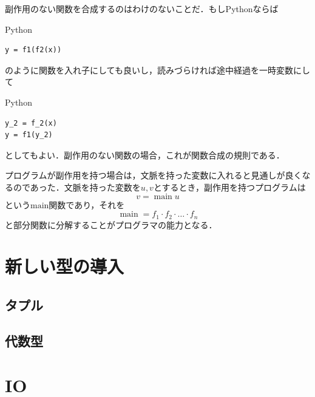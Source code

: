 \documentclass[a4paper]{jsbook}
\newcommand{\programminglanguage}[1]{\textsf{#1}}
\newcommand{\python}{\programminglanguage{Python}}
\newcommand{\code}[1]{\texttt{#1}}
\newenvironment{pythoncode}{\begin{itembox}[r]{\python}}{\end{itembox}}
\DeclareMathOperator{\mathMain}{main}
\newcommand{\mathGeneralMap}{\mathbin{\cdot}}
\begin{document}
副作用のない関数を合成するのはわけのないことだ．もし\python ならば
\begin{pythoncode}
\begin{verbatim}
y = f1(f2(x))
\end{verbatim}
\end{pythoncode}
のように関数を入れ子にしても良いし，読みづらければ途中経過を一時変数にして
\begin{pythoncode}
\begin{verbatim}
y_2 = f_2(x)
y = f1(y_2)
\end{verbatim}
\end{pythoncode}
としてもよい．副作用のない関数の場合，これが関数合成の規則である．

プログラムが副作用を持つ場合は，文脈を持った変数に入れると見通しが良くなるのであった．文脈を持った変数を$u,v$とするとき，副作用を持つプログラムは
\begin{equation}
v=\mathMain u
\end{equation}
という$\text{main}$関数であり，それを
\begin{equation}
\mathMain=f_1\mathGeneralMap f_2\mathGeneralMap\dots\mathGeneralMap f_n
\end{equation}
と部分関数に分解することがプログラマの能力となる．

\chapter{新しい型の導入}

\section{タプル}

\section{代数型}




\chapter{IO}
\end{document}
